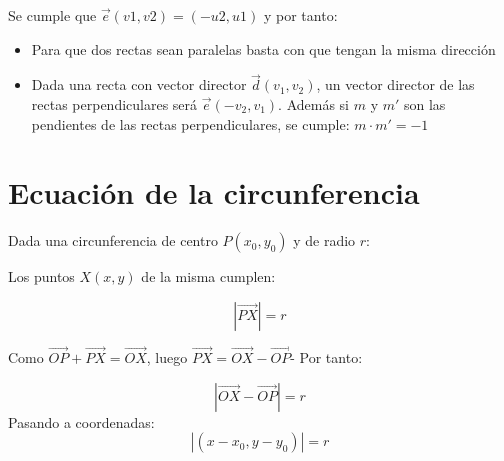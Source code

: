 \documentclass[a4paper,spanish,9pt]{extarticle}
\begin{document}
\begin{multicols*}{2}
Se cumple que $\overrightarrow{e}(v1,v2)=(-u2,u1)$ y por tanto:

\begin{itemize}
\item Para que dos rectas sean paralelas basta con que tengan la misma dirección
\item Dada una recta con vector director $\overrightarrow{d}(v_1,v_2)$, un vector director de las rectas perpendiculares será $\overrightarrow{e}(-v_2,v_1)$. Además si $m$ y $m'$ son las pendientes de las rectas perpendiculares, se cumple: $m\cdot m'=-1$
\end{itemize}

\section{Ecuación de la circunferencia}

Dada una circunferencia de centro  $P(x_0,y_0)$ y de radio $r$:


Los puntos $X(x,y)$ de la misma  cumplen:

$$\left|\overrightarrow{PX}\right|=r $$


Como $\overrightarrow{OP}+\overrightarrow{PX}=\overrightarrow{OX}$, luego $\overrightarrow{PX}=\overrightarrow{OX}-\overrightarrow{OP}$- Por tanto:

$$\left|\overrightarrow{OX}-\overrightarrow{OP}\right|=r $$
Pasando a coordenadas:
$$ \left|(x-x_0,y-y_0)\right|=r $$


\end{multicols*}
\end{document}
